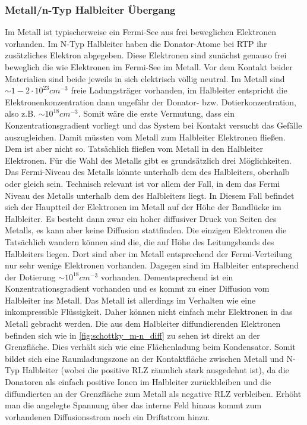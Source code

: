 \documentclass[12pt,a4paper]{report}%
\numberwithin{equation}{section}
\numberwithin{equation}{subsection}
\begin{document}
	\subsubsection{Metall/n-Typ Halbleiter Übergang}
	Im Metall ist typischerweise ein Fermi-See aus frei beweglichen Elektronen vorhanden. Im N-Typ Halbleiter haben die Donator-Atome bei RTP ihr zusätzliches Elektron abgegeben. Diese Elektronen sind zunächst genauso frei beweglich die wie Elektronen im Fermi-See im Metall. Vor dem Kontakt beider Materialien sind beide jeweils in sich elektrisch völlig neutral. Im Metall sind $\sim 1-2 \cdot 10^{23} cm^{-3}$ freie Ladungsträger vorhanden, im Halbleiter entspricht die Elektronenkonzentration dann ungefähr der Donator- bzw. Dotierkonzentration, also z.B. $\sim 10^{18} cm^{-3}$. Somit wäre die erste Vermutung, dass ein Konzentrationsgradient vorliegt und das System bei Kontakt versucht das Gefälle auszugleichen. Damit müssten vom Metall zum Halbleiter Elektronen fließen. Dem ist aber nicht so. Tatsächlich fließen vom Metall in den Halbleiter Elektronen. Für die Wahl des Metalls gibt es grundsätzlich drei Möglichkeiten. Das Fermi-Niveau des Metalls könnte unterhalb dem des Halbleiters, oberhalb oder gleich sein. Technisch relevant ist vor allem der Fall, in dem das Fermi Niveau des Metalls unterhalb dem des Halbleiters liegt. In Diesem Fall befindet sich der Hauptteil der Elektronen im Metall auf der Höhe der Bandlücke im Halbleiter. Es besteht dann zwar ein hoher diffusiver Druck von Seiten des Metalls, es kann aber keine Diffusion stattfinden. Die einzigen Elektronen die Tatsächlich wandern können sind die, die auf Höhe des Leitungsbands des Halbleiters liegen. Dort sind aber im Metall entsprechend der Fermi-Verteilung nur sehr wenige Elektronen vorhanden. Dagegen sind im Halbleiter entsprechend der Dotierung $\sim 10^{18} cm^{-3}$ vorhanden. Dementsprechend ist ein Konzentrationsgradient vorhanden und es kommt zu einer Diffusion vom Halbleiter ins Metall. Das Metall ist allerdings im Verhalten wie eine inkompressible Flüssigkeit. Daher können nicht einfach mehr Elektronen in das Metall gebracht werden. Die aus dem Halbleiter diffundierenden Elektronen befinden sich wie in \eqref{fig:schottky_m-n_diff} zu sehen ist direkt an der Grenzfläche. Dies verhält sich wie eine Flächenladung beim Kondensator. Somit bildet sich eine Raumladungszone an der Kontaktfläche zwischen Metall und N-Typ Halbleiter (wobei die positive RLZ räumlich stark ausgedehnt ist), da die Donatoren als einfach positive Ionen im Halbleiter zurückbleiben und die diffundierten an der Grenzfläche zum Metall als negative RLZ verbleiben. Erhöht man die angelegte Spannung über das interne Feld hinaus kommt zum vorhandenen Diffusionsstrom noch ein Driftstrom hinzu. 
\end{document}
